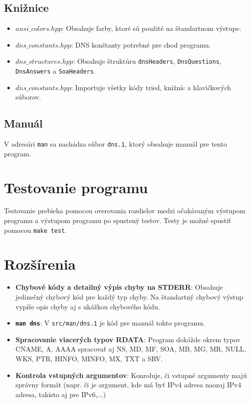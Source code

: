 \documentclass[a4paper, 11pt]{article}
\begin{document}
	\subsection{Knižnice}
	\begin{itemize}
		\item \textbf{$ansi\_colors.hpp$}: Obsahuje farby, ktoré sú použité na štandartnom výstupe.
		\item \textbf{$dns\_constants.hpp$}: DNS konštanty potrebné pre chod programu.
		\item \textbf{$dns\_structures.hpp$}: Obsahuje štruktúru \texttt{dnsHeaders},  \texttt{DnsQuestions}, \texttt{DnsAnswers} a \texttt{SoaHeaders}.
		\item \textbf{$dns\_constants.hpp$}: Importuje všetky kódy tried, knižníc a hlavičkových súborov.
	\end{itemize}
	
	\subsection{Manuál}
	V adresári \texttt{man} sa nachádza súbor \texttt{dns.1}, ktorý obsahuje manuál pre tento program.

	\section{Testovanie programu}
	Testovanie prebieha pomocou overovania rozdielov medzi očakávaným výstupom programu a výstupom programu po spustený testov. Testy je možné spustiť pomocou \texttt{make test}.
	
	\section{Rozšírenia}
	\begin{itemize}
		\item \textbf{Chybové kódy a detailný výpis chyby na STDERR}: Obsahuje jedinečný chybový kód pre každý typ chyby. Na štandartný chybový výstup vypíše opis chyby aj s ukážkou chybového kódu.
		\item \textbf{\texttt{man dns}}: V \texttt{src/man/dns.1} je kód pre manuál tohto programu.
		\item \textbf{Spracovanie viacerých typov RDATA}: Program dokážde okrem typov CNAME, A, AAAA spracovať aj NS, MD, MF, SOA, MB, MG, MR, NULL, WKS, PTR, HINFO, MINFO, MX, TXT a SRV.
		\item \textbf{Kontrola vstupných argumentov}: Konroluje, či vstupné argumenty majú správny formát (napr. či je argument, kde má byť IPv4 adresa naozaj IPv4 adresa, takisto aj pre IPv6,...)
	\end{itemize}
	
\end{document}

